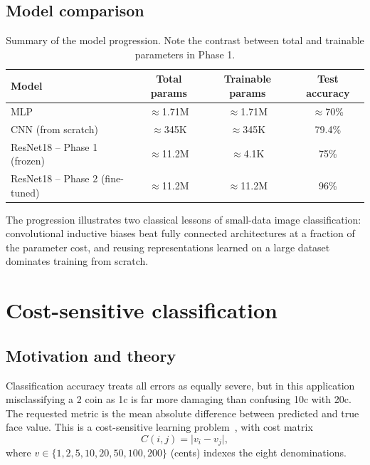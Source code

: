 \documentclass[11pt,a4paper]{article}
\begin{document}
\subsection{Model comparison}

\begin{table}[ht]
  \centering
  \begin{tabular}{lccc}
    \toprule
    Model & Total params & Trainable params & Test accuracy \\
    \midrule
    MLP & $\approx$1.71M & $\approx$1.71M & $\approx$70\% \\
    CNN (from scratch) & $\approx$345K & $\approx$345K & 79.4\% \\
    ResNet18 -- Phase 1 (frozen) & $\approx$11.2M & $\approx$4.1K & 75\% \\
    ResNet18 -- Phase 2 (fine-tuned) & $\approx$11.2M & $\approx$11.2M & 96\%  \\
    \bottomrule
  \end{tabular}
  \caption{Summary of the model progression. Note the contrast between total and
  trainable parameters in Phase 1.}
  \label{tab:comparison}
\end{table}

The progression illustrates two classical lessons of small-data image classification:
convolutional inductive biases beat fully connected architectures at a fraction of the
parameter cost, and reusing representations learned on a large dataset dominates
training from scratch.

\section{Cost-sensitive classification}

\subsection{Motivation and theory}

Classification accuracy treats all errors as equally severe, but in this application
misclassifying a 2\officialeuro{} coin as 1c is far more damaging than confusing 10c with 20c.
The requested metric is the mean absolute difference between predicted and true face
value. This is a cost-sensitive learning problem~\cite{elkan2001foundations}, with cost matrix
\begin{equation}
  C(i, j) = \lvert v_i - v_j \rvert,
\end{equation}
where $v \in \{1, 2, 5, 10, 20, 50, 100, 200\}$ (cents) indexes the eight
denominations.
\end{document}
